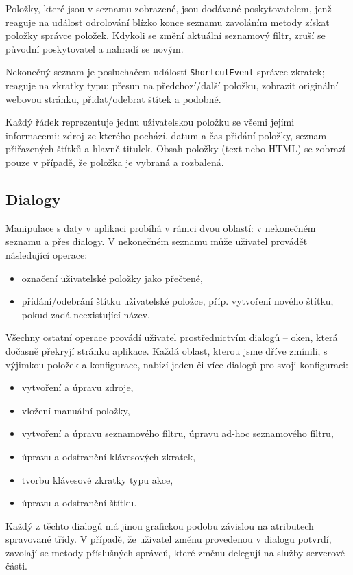 Položky, které jsou v seznamu zobrazené, jsou dodávané poskytovatelem, jenž reaguje na událost odrolování blízko konce seznamu zavoláním metody získat položky správce položek.
Kdykoli se změní aktuální seznamový filtr, zruší se původní poskytovatel a nahradí se novým.

Nekonečný seznam je posluchačem událostí \verb|ShortcutEvent| správce zkratek; reaguje na zkratky typu: přesun na předchozí/další položku, zobrazit originální webovou stránku, přidat/odebrat štítek a podobné.

Každý řádek reprezentuje jednu uživatelskou položku se všemi jejími informacemi: zdroj ze kterého pochází, datum a čas přidání položky, seznam přiřazených štítků a hlavně titulek.
Obsah položky (text nebo HTML) se zobrazí pouze v případě, že položka je vybraná a rozbalená.

\subsection{Dialogy}
Manipulace s daty v aplikaci probíhá v rámci dvou oblastí: v nekonečném seznamu a přes dialogy.
V nekonečném seznamu může uživatel provádět následující operace:
\begin{itemize}
	\item označení uživatelské položky jako přečtené,
	\item přidání/odebrání štítku uživatelské položce, příp. vytvoření nového štítku, pokud zadá neexistující název.
\end{itemize}

Všechny ostatní operace provádí uživatel prostřednictvím dialogů -- oken, která dočasně překryjí stránku aplikace.
Každá oblast, kterou jsme dříve zmínili, s výjimkou položek a konfigurace, nabízí jeden či více dialogů pro svoji konfiguraci:
\begin{itemize}
	\item vytvoření a úpravu zdroje,
	\item vložení manuální položky,
	\item vytvoření a úpravu seznamového filtru, úpravu ad-hoc seznamového filtru,
	\item úpravu a odstranění klávesových zkratek,
	\item tvorbu klávesové zkratky typu akce,
	\item úpravu a odstranění štítku.
\end{itemize}

Každý z těchto dialogů má jinou grafickou podobu závislou na atributech spravované třídy.
V případě, že uživatel změnu provedenou v dialogu potvrdí, zavolají se metody příslušných správců, které změnu delegují na služby serverové části.

